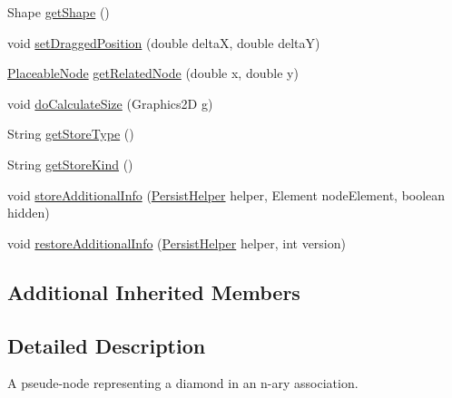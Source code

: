 \begin{DoxyCompactItemize}
\item 
Shape \hyperlink{classorg_1_1tzi_1_1use_1_1gui_1_1views_1_1diagrams_1_1elements_1_1_diamond_node_ae4ae0b1631806ed8d0aa20f5cb4d14da}{get\-Shape} ()
\item 
void \hyperlink{classorg_1_1tzi_1_1use_1_1gui_1_1views_1_1diagrams_1_1elements_1_1_diamond_node_a05ec4f13acec6bd5acbe2a0112781765}{set\-Dragged\-Position} (double delta\-X, double delta\-Y)
\item 
\hyperlink{classorg_1_1tzi_1_1use_1_1gui_1_1views_1_1diagrams_1_1elements_1_1_placeable_node}{Placeable\-Node} \hyperlink{classorg_1_1tzi_1_1use_1_1gui_1_1views_1_1diagrams_1_1elements_1_1_diamond_node_a60dcfc9abef451d8557b0e4d35dbe736}{get\-Related\-Node} (double x, double y)
\item 
void \hyperlink{classorg_1_1tzi_1_1use_1_1gui_1_1views_1_1diagrams_1_1elements_1_1_diamond_node_ac32d37b5d0a7c180d08bd532057d0329}{do\-Calculate\-Size} (Graphics2\-D g)
\item 
String \hyperlink{classorg_1_1tzi_1_1use_1_1gui_1_1views_1_1diagrams_1_1elements_1_1_diamond_node_aa0e7681be4fa6b676fd692bde828a2fd}{get\-Store\-Type} ()
\item 
String \hyperlink{classorg_1_1tzi_1_1use_1_1gui_1_1views_1_1diagrams_1_1elements_1_1_diamond_node_a2a443cfb49db2eabcd9c96a5d5fab343}{get\-Store\-Kind} ()
\item 
void \hyperlink{classorg_1_1tzi_1_1use_1_1gui_1_1views_1_1diagrams_1_1elements_1_1_diamond_node_adb2925ab2429eeb113343728c5c9621e}{store\-Additional\-Info} (\hyperlink{classorg_1_1tzi_1_1use_1_1gui_1_1util_1_1_persist_helper}{Persist\-Helper} helper, Element node\-Element, boolean hidden)
\item 
void \hyperlink{classorg_1_1tzi_1_1use_1_1gui_1_1views_1_1diagrams_1_1elements_1_1_diamond_node_a5d6af9fe29c7b316af6a63c47c6be3c7}{restore\-Additional\-Info} (\hyperlink{classorg_1_1tzi_1_1use_1_1gui_1_1util_1_1_persist_helper}{Persist\-Helper} helper, int version)
\end{DoxyCompactItemize}
\subsection*{Additional Inherited Members}


\subsection{Detailed Description}
A pseude-\/node representing a diamond in an n-\/ary association.

